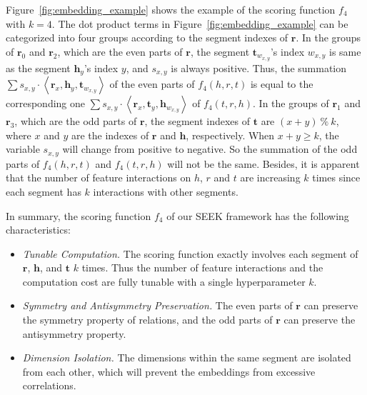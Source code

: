 \documentclass[11pt,a4paper]{article}
\newcommand{\SegVec}[1]{\mathbf{#1}}
\begin{document}
Figure~\ref{fig:embedding_example} shows the example of the scoring function $f_4$ with $k=4$. The dot product terms in Figure~\ref{fig:embedding_example} can be categorized into four groups according to the segment indexes of $\SegVec{r}$.  
In the groups of $\SegVec{r}_0$ and $\SegVec{r}_2$, which are the even parts of $\SegVec{r}$, the segment $\SegVec{t}_{w_{x,y}}$'s index $w_{x,y}$ is same as the segment $\SegVec{h}_y$'s index $y$, and $s_{x,y}$ is always positive. Thus, the summation $\sum s_{x, y} \cdot \left< \SegVec{r}_x, \SegVec{h}_y, \SegVec{t}_{w_{x,y}} \right>$ of the even parts of  $f_4(h, r, t)$ is equal to the corresponding one $\sum s_{x, y} \cdot \left< \SegVec{r}_x, \SegVec{t}_y, \SegVec{h}_{w_{x,y}} \right>$ of $f_4(t, r, h)$. 
In the groups of $\SegVec{r}_1$ and $\SegVec{r}_3$, which are the odd parts of $\SegVec{r}$, the segment indexes of $\SegVec{t}$ are $(x + y) \ \% \ k$, where $x$ and $y$ are the indexes of $\SegVec{r}$ and $\SegVec{h}$, respectively. When $x + y \geq k$, the variable $s_{x, y}$ will change from positive to negative. So the summation of the odd parts of $f_4(h, r, t)$ and $f_4(t, r, h)$ will not be the same. Besides, it is apparent that the number of feature interactions on $h$, $r$ and $t$ are increasing $k$ times since each segment has $k$ interactions with other segments.

In summary, the scoring function $f_4$ of our SEEK framework has the following characteristics:
\begin{itemize}[label={-}]

	
	\item \textit{Tunable Computation.} The scoring function exactly involves each segment of $\SegVec{r}$, $\SegVec{h}$, and $\SegVec{t}$ $k$ times. Thus the number of feature interactions and the computation cost are fully tunable with a single hyperparameter $k$.
	
	\item \textit{Symmetry and Antisymmetry Preservation.}  The even parts of $\SegVec{r}$ can preserve the symmetry property of relations, and the odd parts of $\SegVec{r}$ can preserve the antisymmetry property.
	
	\item \textit{Dimension Isolation.}  The dimensions within the same segment are isolated from each other, which will prevent the embeddings from excessive correlations.\end{itemize}

\begin{comment}
\begin{figure*}[!h]
\centering
\texttt{[image: figure/SEG-Example-8-2]}
\caption{Scoring Function with $k=8$}
\label{fig:embedding_example_8}
\end{figure*}
\end{comment}
\end{document}
